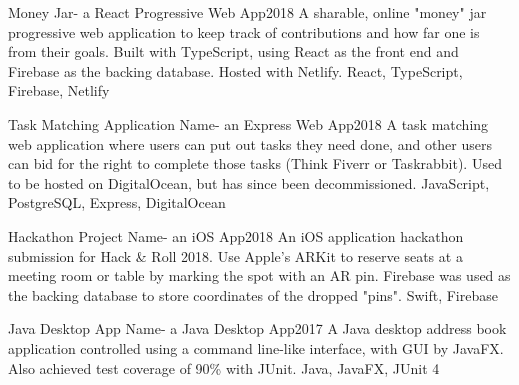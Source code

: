 %
%
%


\begin{projects}
	\project
	{Money Jar}{- a React Progressive Web App}{2018}
	{  }
	{A sharable, online "money" jar progressive web application to keep track of contributions and how far one is from their goals. Built with TypeScript, using React as the front end and Firebase as the backing database. Hosted with Netlify.}
	{React, TypeScript, Firebase, Netlify}

	\project
	{Task Matching Application Name}{- an Express Web App}{2018}
	{}
	{A task matching web application where users can put out tasks they need done, and other users can bid for the right to complete those tasks (Think Fiverr or Taskrabbit). Used to be hosted on DigitalOcean, but has since been decommissioned.}
	{JavaScript, PostgreSQL, Express, DigitalOcean}

	\project
	{Hackathon Project Name}{- an iOS App}{2018}
	{}
	{An iOS application hackathon submission for Hack \& Roll 2018. Use Apple’s ARKit to reserve seats at a meeting room or table by marking the spot with an AR pin.  Firebase was used as the backing database to store coordinates of the dropped "pins".}
	{Swift, Firebase}

	\project
	{Java Desktop App Name}{- a Java Desktop App}{2017}
	{}
	{A Java desktop address book application controlled using a command line-like interface, with GUI by JavaFX. Also achieved test coverage of 90\% with JUnit.}
	{Java, JavaFX, JUnit 4}

\end{projects}
